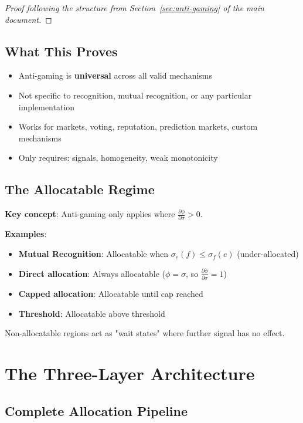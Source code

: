 \documentclass[11pt,a4paper]{article}
\theoremstyle{definition}
\theoremstyle{remark}
\begin{document}
\begin{proof}
[Proof following the structure from Section~\ref{sec:anti-gaming} of the main document]
\end{proof}

\subsection{What This Proves}

\begin{itemize}
\item Anti-gaming is \textbf{universal} across all valid mechanisms
\item Not specific to recognition, mutual recognition, or any particular implementation
\item Works for markets, voting, reputation, prediction markets, custom mechanisms
\item Only requires: signals, homogeneity, weak monotonicity
\end{itemize}

\subsection{The Allocatable Regime}

\textbf{Key concept}: Anti-gaming only applies where $\frac{\partial \phi}{\partial \sigma} > 0$.

\textbf{Examples}:
\begin{itemize}
\item \textbf{Mutual Recognition}: Allocatable when $\sigma_e(f) \le \sigma_f(e)$ (under-allocated)
\item \textbf{Direct allocation}: Always allocatable ($\phi = \sigma$, so $\frac{\partial \phi}{\partial \sigma} = 1$)
\item \textbf{Capped allocation}: Allocatable until cap reached
\item \textbf{Threshold}: Allocatable above threshold
\end{itemize}

Non-allocatable regions act as "wait states" where further signal has no effect.

\section{The Three-Layer Architecture}

\subsection{Complete Allocation Pipeline}
\end{document}
